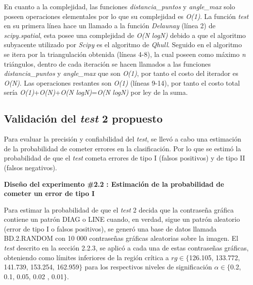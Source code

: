 \documentclass[12pt]{report}
\begin{document}
En cuanto a la complejidad, las funciones \textit{distancia\_puntos} y \textit{angle\_max} solo poseen operaciones elementales por lo que su complejidad es \textit{O(1)}. La función \textit{test} en su primera línea hace un llamado a la función  \textit{Delaunay} (línea 2) de \textit{scipy.spatial}, esta posee una complejidad de \textit{O(N logN)} debido a que el algoritmo subyacente utilizado por \textit{Scipy} es el algoritmo de \textit{Qhull}. Seguido en el algoritmo se itera por la triangulación obtenida (líneas 4-8), la cual poseen como máximo \textit{n} triángulos, dentro de cada iteración se hacen llamados a las  funciones \textit{distancia\_puntos} y \textit{angle\_max}  que son \textit{O(1)}, por tanto el costo del iterador es \textit{O(N)}. Las operaciones restantes son \textit{O(1)} (líneas 9-14), por tanto el costo total sería \textit{O(1)}+\textit{O(N)}+\textit{O(N logN)}=\textit{O(N logN)} por ley de la suma.

\subsection{Validación del \textit{test} 2 propuesto}
\label{sec:2.4}

Para evaluar la precisión y confiabilidad del \textit{test}, se llevó a cabo una estimación de la probabilidad de cometer errores en la clasificación. Por lo que se estimó la probabilidad de que el \textit{test} cometa  errores de tipo I (falsos positivos) y de tipo II (falsos negativos).

\textbf{Diseño del experimento \#2.2 : Estimación de la probabilidad de cometer un error de tipo I} 

Para estimar la probabilidad de que el \textit{test} 2 decida que la contraseña gráfica contiene un patrón DIAG o LINE cuando, en verdad, sigue un patrón aleatorio (error de tipo I o falsos positivos), se generó una base de datos llamada BD.2.RANDOM con 10 000 contraseñas gráficas aleatorias sobre la imagen. El \textit{test} descrito en la sección 2.2.3, se aplicó a cada una de estas contraseñas gráficas, obteniendo como límites inferiores de la región crítica a  $rg \in \{$126.105, 133.772, 141.739, 153.254, 162.959$\}$ para los respectivos  niveles de significación $\alpha \in \{$0.2, 0.1, 0.05, 0.02 , 0.01$\}$.
\end{document}
